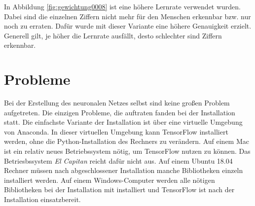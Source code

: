 In Abbildung \ref{fig:gewichtung0008} ist eine höhere Lernrate verwendet wurden. Dabei sind die einzelnen Ziffern nicht mehr für den Menschen erkennbar bzw. nur noch zu erraten. Dafür wurde mit dieser Variante eine höhere Genauigkeit erzielt. Generell gilt, je höher die Lernrate ausfällt, desto schlechter sind Ziffern erkennbar.

\section{Probleme}
\label{sec:probleme}
\printsubchapterauthor{\authorNiklas}
Bei der Erstellung des neuronalen Netzes selbst sind keine großen Problem aufgetreten. Die einzigen Probleme, die auftraten fanden bei der Installation statt. Die einfachste Variante der Installation ist über eine virtuelle Umgebung von Anaconda. In dieser virtuellen Umgebung kann TensorFlow installiert werden, ohne die Python-Installation des Rechners zu verändern. Auf einem Mac ist ein relativ neues Betriebssystem nötig, um TensorFlow nutzen zu können. Das Betriesbssystem \textit{El Capitan} reicht dafür nicht aus. Auf einem Ubuntu 18.04 Rechner müssen nach abgeschlossener Installation manche Bibliotheken einzeln installiert werden. Auf einem Windows-Computer werden alle nötigen Bibliotheken bei der Installation mit installiert und TensorFlow ist nach der Installation einsatzbereit.
